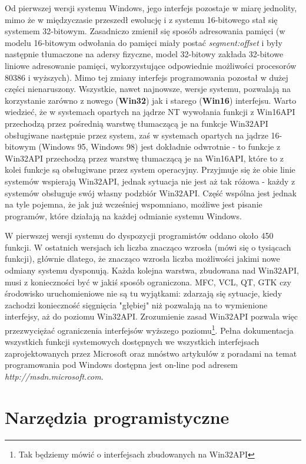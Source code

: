 Od pierwszej wersji systemu Windows, jego interfejs pozostaje w miarę jednolity, mimo że w międzyczasie
przeszedł ewolucję i z systemu 16-bitowego stał się systemem 32-bitowym. Zasadniczo zmienił się
sposób adresowania pamięci (w modelu 16-bitowym odwołania do pamięci miały postać
{\em segment:offset} i były następnie tłumaczone na adersy fizyczne, model 32-bitowy zakłada
32-bitowe liniowe adresowanie pamięci, wykorzystujące odpowiednie możliwości procesorów 80386 i wyższych).
Mimo tej zmiany interfejs programowania pozostał w dużej części nienaruszony. Wszystkie, nawet
najnowsze, wersje systemu, pozwalają na korzystanie zarówno z nowego ({\bf Win32})
jak i starego ({\bf Win16}) interfejsu. Warto wiedzieć, że w systemach opartych na jądrze NT wywołania
funkcji z Win16API przechodzą przez pośrednią warstwę tłumaczącą je na funkcje Win32API obsługiwane
następnie przez system, zaś w systemach opartych na jądrze 16-bitowym 
(Windows 95, Windows 98) jest dokładnie odwrotnie - to funkcje z Win32API przechodzą przez 
warstwę tłumaczącą je na Win16API, które to z kolei funkcje są obsługiwane przez system operacyjny. 
Przyjmuje się że obie linie systemów wspierają Win32API, jednak sytuacja nie jest aż tak różowa -
każdy z systemów obsługuje swój własny podzbiór Win32API. Część wspólna jest jednak na tyle pojemna, że
jak już wcześniej wspomniano, możliwe jest pisanie programów, które działają na każdej odmianie systemu
Windows. 

W pierwszej wersji systemu do dyspozycji programistów oddano około 450 funkcji. W ostatnich wersjach
ich liczba znacząco wzrosła (mówi się o tysiącach funkcji), głównie dlatego, że znacząco wzrosła liczba
możliwości jakimi nowe odmiany systemu dysponują. Każda kolejna warstwa, 
zbudowana nad Win32API, musi z konieczności
być w jakiś sposób ograniczona. MFC, VCL, QT, GTK czy środowisko uruchomieniowe \NETFramework{} 
nie są tu wyjątkami: zdarzają się sytuacje, kiedy zachodzi konieczność sięgnięcia "głębiej" niż pozwalają na to 
wymienione interfejsy, aż do poziomu Win32API. Zrozumienie zasad Win32API pozwala więc przezwyciężać
ograniczenia interfejsów wyższego poziomu\footnote{Tak będziemy mówić o interfejsach zbudowanych na Win32API}.
Pełna dokumentacja wszystkich funkcji systemowych dostępnych we wszystkich interfejsach zaprojektowanych
przez Microsoft oraz mnóstwo artykułów z poradami na temat programowania pod Windows dostępna
jest on-line pod adresem {\em http://msdn.microsoft.com}.

\section{Narzędzia programistyczne} 

